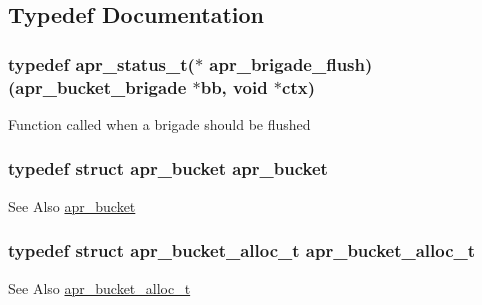 \subsection{Typedef Documentation}
\hypertarget{group___a_p_r___util___bucket___brigades_gacdf6dc9d4c81c64834e5e509281f7f16}{
\subsubsection[{apr\-\_\-brigade\-\_\-flush}]{\setlength{\rightskip}{0pt plus 5cm}typedef apr\-\_\-status\-\_\-t($\ast$ apr\-\_\-brigade\-\_\-flush)({\bf apr\-\_\-bucket\-\_\-brigade} $\ast$bb, void $\ast$ctx)}}\label{group___a_p_r___util___bucket___brigades_gacdf6dc9d4c81c64834e5e509281f7f16}
Function called when a brigade should be flushed \hypertarget{group___a_p_r___util___bucket___brigades_gaa17a456120961b1c5af0525f4900a457}{
\subsubsection[{apr\-\_\-bucket}]{\setlength{\rightskip}{0pt plus 5cm}typedef struct {\bf apr\-\_\-bucket} {\bf apr\-\_\-bucket}}}\label{group___a_p_r___util___bucket___brigades_gaa17a456120961b1c5af0525f4900a457}
\begin{DoxySeeAlso}{See Also}
\hyperlink{structapr__bucket}{apr\-\_\-bucket} 
\end{DoxySeeAlso}
\hypertarget{group___a_p_r___util___bucket___brigades_ga9a30babfeb6e290db124d8f9b69e49e4}{
\subsubsection[{apr\-\_\-bucket\-\_\-alloc\-\_\-t}]{\setlength{\rightskip}{0pt plus 5cm}typedef struct {\bf apr\-\_\-bucket\-\_\-alloc\-\_\-t} {\bf apr\-\_\-bucket\-\_\-alloc\-\_\-t}}}\label{group___a_p_r___util___bucket___brigades_ga9a30babfeb6e290db124d8f9b69e49e4}
\begin{DoxySeeAlso}{See Also}
\hyperlink{group___a_p_r___util___bucket___brigades_ga9a30babfeb6e290db124d8f9b69e49e4}{apr\-\_\-bucket\-\_\-alloc\-\_\-t} 
\end{DoxySeeAlso}
